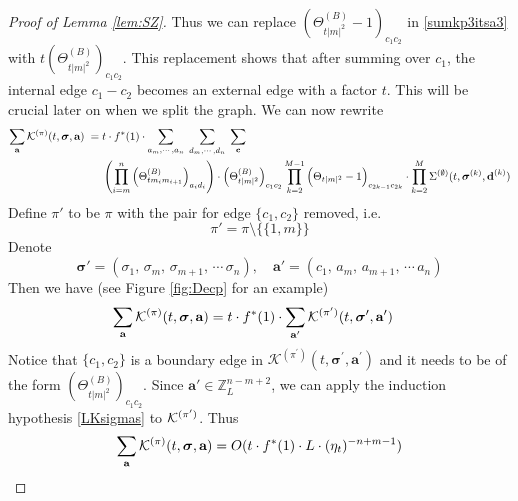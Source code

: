 \documentclass[10pt,reqno]{article}
\theoremstyle{plain} %
\theoremstyle{remark}
\numberwithin{equation}{section}
\begin{document}
\begin{proof}[ Proof of Lemma  \ref{lem:SZ}]
Thus  we can replace $(\Theta^{(B)}_{t|m|^2}-1)_{c_1c_2}$ in \eqref{sumkp3itsa3} with $t(\Theta^{(B)}_{t|m|^2})_{c_1c_2}$.  
This replacement shows that after  summing  over $c_1$, the internal edge $c_1-c_2$ becomes an external edge with a factor $t$. This will be crucial later on when we split the graph.  We can now rewrite 
\begin{align}\label{sumkp4itsa4}
\sum_{\textbf{a}}{\cal K}^{(\pi)}(t, \boldsymbol{\sigma}, \textbf{a}) \;=\;&t\cdot f^*(1) \cdot  
\sum_{a_m,\cdots , a_n}\;
\sum_{d_m,\cdots , d_n}\;
\sum_{\textbf{c}}\\\nonumber
&\left(\prod_{i=m}^{n}\left(\Theta^{(B)}_{tm_im_{i+1}}\right)_{a_id_i}\right)\cdot 
\left(\Theta^{(B)}_{t|m|^2}\right)_{c_1c_2}
\prod_{k=2}^{M-1}\Big(\Theta_{{t|m|^2}}-1\Big)_{c_{2k-1}c_{2k}}
\cdot
 \prod_{k=2}^{M}{\Sigma}^{(\emptyset)}(t, \boldsymbol{\sigma}^{(k)}, \textbf{d}^{(k)})   
\end{align}
  Define $\pi'$ to be $\pi$ with the pair for edge $\{c_1, c_2\}$ removed, i.e. 
  $$
  \pi'=\pi\setminus\{\{1,m\}\}
  $$
  Denote 
$$
\boldsymbol{\sigma}'=(\sigma_1,  \,\sigma_{m}, \,\sigma_{m+1}, \,\cdots  \,\sigma_{n}) ,\quad \textbf{a}'=(c_1, \,a_{m},\,a_{m+1},\,\cdots\, a_{n})
$$
Then we have (see  Figure \ref{fig:Decp} for an example) 
\begin{align}\label{sumkp5itsa5}
\sum_{\textbf{a}}{\cal K}^{(\pi)}(t, \boldsymbol{\sigma}, \textbf{a})=t\cdot f^*(1) &\cdot  
\sum_{\textbf{a}'}{\cal K}^{(\pi')}(t, \boldsymbol{\sigma}', \textbf{a}') 
\end{align} 
Notice that   $\{c_1, c_2\}$  is  a boundary  edge in  
$\mathcal{K}^{\left(\pi^{\prime}\right)}\left(t, \boldsymbol{\sigma}^{\prime}, \mathbf{a}^{\prime}\right)$ and it needs to be of the form $\left(\Theta_{t|m|^2}^{(B)}\right)_{c_1 c_2}$.
Since $\textbf{a}'\in \mathbb Z_L^{n-m+2}$, we can apply the induction hypothesis  \eqref{LKsigmas} to  ${\cal K}^{(\pi')}$. Thus 
\begin{align}\label{sumkp6itsa6}
\sum_{\textbf{a}}{\cal K}^{(\pi)}(t, \boldsymbol{\sigma}, \textbf{a})= {O(t\cdot f^*(1) \cdot L\cdot (\eta_t)^{-n+m-1})}
\end{align}



\end{proof}
\end{document}
